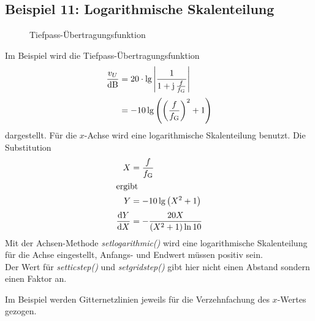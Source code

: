 \documentclass[ngerman,origlongtable]{scrartcl}
\newcommand{\includepgfimage}[2]{%
\begin{figure}%
{\centering%
\caption{#2}\label{fig:#1}%
}%
\end{figure}%
}
\begin{document}
\subsection[Logarithmisch]{Beispiel 11: Logarithmische Skalenteilung}
\includepgfimage{../examples/test012a}{Tiefpass-Übertragungsfunktion}
Im Beispiel wird die Tiefpass-Übertragungsfunktion
\begin{align*}
\frac{v_U}{\text{dB}}&=20\cdot\lg{\left|\frac{1}{1+\operatorname{\text{j}}\frac{f}{f_{\text{G}}}}\right|}\\[0.2em]
&=-10\lg{\left({\left(\frac{f}{f_{\text{G}}}\right)}^2+1\right)}\end{align*}
dargestellt. Für die \(x\)-Achse wird eine logarithmische Skalenteilung
benutzt.
Die Substitution
\begin{align*}
X&=\frac{f}{f_{\text{G}}}\\
\intertext{ergibt}
Y&=-10\lg{\left(X^2+1\right)}\\[0.2em]
\frac{\mathrm{d} Y}{\mathrm{d} X}&=-\frac{20X}{\left(X^2+1\right)\ln{10}}
\end{align*}
Mit der Achsen-Methode
\textit{set\textunderscore{}logarithmic()\/}
wird eine logarithmische Skalenteilung für die Achse eingestellt, Anfangs-
und Endwert müssen positiv sein.\\
Der Wert für
\textit{set\textunderscore{}tic\textunderscore{}step()\/} und
\textit{set\textunderscore{}grid\textunderscore{}step()\/} gibt hier nicht
einen Abstand sondern einen Faktor an.

Im Beispiel werden Gitternetzlinien jeweils für die Verzehnfachung des
\(x\)-Wertes gezogen.
\clearpage

\clearpage
\end{document}
